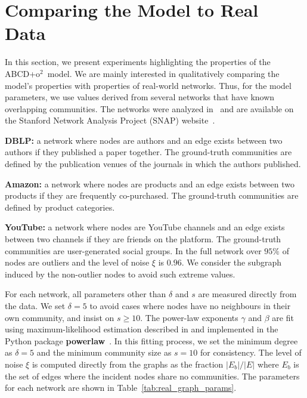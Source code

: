 \documentclass[review,los,12pt]{ryethesis}
\newcommand{\abcdoo}{{ABCD+o$^2$}}
\begin{document}
\section{Comparing the Model to Real Data}

In this section, we present experiments highlighting the properties of the \abcdoo\ model.
We are mainly interested in qualitatively comparing the model's properties with properties of real-world networks.
Thus, for the model parameters, we use values derived from several networks that have known overlapping communities.
The networks were analyzed in~\cite{yang2012defining} and are available on the Stanford Network Analysis Project (SNAP) website~\cite{snap}.

\bigskip
\noindent
\textbf{DBLP:} a network where nodes are authors and an edge exists between two authors if they published a paper together.
The ground-truth communities are defined by the publication venues of the journals in which the authors published.

\smallskip
\noindent
\textbf{Amazon:} a network where nodes are products and an edge exists between two products if they are frequently co-purchased.
The ground-truth communities are defined by product categories. 

\smallskip
\noindent
\textbf{YouTube:} a network where nodes are YouTube channels and an edge exists between two channels if they are friends on the platform.
The ground-truth communities are user-generated social groups.
In the full network over $95\%$ of nodes are outliers and the level of noise $\xi$ is $0.96$.
We consider the subgraph induced by the non-outlier nodes to avoid such extreme values.

\bigskip
For each network, all parameters other than $\delta$ and $s$ are measured directly from the data.
We set $\delta = 5$ to avoid cases where nodes have no neighbours in their own community, and insist on $s \geq 10$.
The power-law exponents $\gamma$ and $\beta$ are fit using maximum-likelihood estimation described in \cite{clauset2009powerlaw} and implemented in the Python package \textbf{powerlaw}~\cite{alstott2014powerlaw}.
In this fitting process, we set the minimum degree as $\delta = 5$ and the minimum community size as $s=10$ for consistency.
The level of noise $\xi$ is computed directly from the graphs as the fraction $|E_b|/|E|$ where $E_b$ is the set of edges where the incident nodes share no communities.
The parameters for each network are shown in Table~\ref{tab:real_graph_params}.
\end{document}
